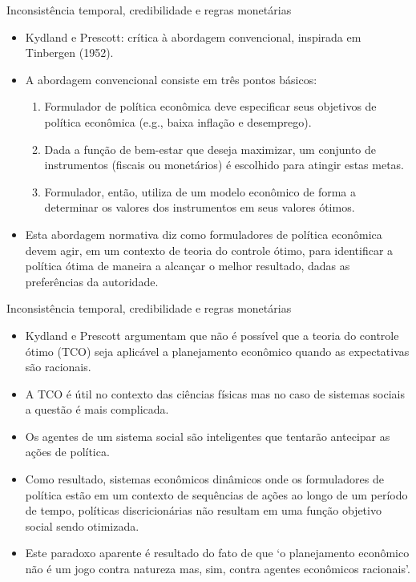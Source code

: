 \documentclass[10pt]{beamer}
\begin{document}
\begin{frame}{Inconsistência temporal, credibilidade e regras monetárias}
    \begin{itemize}
        \item Kydland e Prescott: crítica à abordagem convencional, inspirada em Tinbergen (1952).
        \bigskip
        \item A abordagem convencional consiste em três pontos básicos:
        \bigskip
        \begin{enumerate}
            \item Formulador de política econômica deve especificar seus objetivos de política econômica (e.g., baixa inflação e desemprego).
            \bigskip
            \item Dada a função de bem-estar que deseja maximizar, um conjunto de instrumentos (fiscais ou monetários) é escolhido para atingir estas metas.
            \bigskip
            \item Formulador, então, utiliza de um modelo econômico de forma a determinar os valores dos instrumentos em seus valores ótimos.
        \end{enumerate}
        \bigskip
        \item Esta abordagem normativa diz como formuladores de política econômica devem agir, em um contexto de teoria do controle ótimo, para identificar a política ótima de maneira a alcançar o melhor resultado, dadas as preferências da autoridade.
    \end{itemize}
\end{frame}

\begin{frame}{Inconsistência temporal, credibilidade e regras monetárias}
    \begin{itemize}
        \item Kydland e Prescott argumentam que não é possível que a teoria do controle ótimo (TCO) seja aplicável a planejamento econômico quando as expectativas são racionais.
        \bigskip
        \item A TCO é útil no contexto das ciências físicas mas no caso de sistemas sociais a questão é mais complicada.
        \bigskip
        \item Os agentes de um sistema social são inteligentes que tentarão antecipar as ações de política.
        \bigskip
        \item Como resultado, sistemas econômicos dinâmicos onde os formuladores de política estão em um contexto de sequências de ações ao longo de um período de tempo, políticas discricionárias não resultam em uma função objetivo social sendo otimizada.
        \bigskip
        \item Este paradoxo aparente é resultado do fato de que `o planejamento econômico não é um jogo contra natureza mas, sim, contra agentes econômicos racionais'.
    \end{itemize}
\end{frame}
\end{document}
